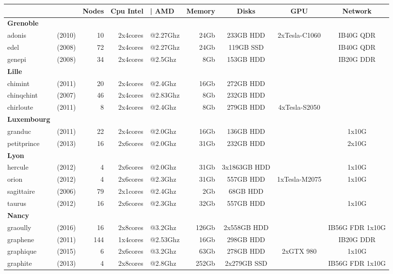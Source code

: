 \begin{center}
\begin{tabular}{|lr|r|rl|r|c|c|c|}
\hline
  & & \textbf{Nodes} & \textbf{Cpu Intel}&\textbf{| AMD} & \textbf{Memory} & \textbf{Disks} & \textbf{GPU} & \textbf{Network} \\ 
\hline
\textbf{Grenoble} &  &  &  &  &  &  &  &  \\
adonis & (2010) & 10 & 2x4cores & @2.27Ghz & 24Gb &  233GB HDD & 2xTesla-C1060 & IB40G QDR \\
edel & (2008) & 72 & 2x4cores & @2.27Ghz & 24Gb &  119GB SSD &  & IB40G QDR \\
genepi & (2008) & 34 & 2x4cores & @2.5Ghz & 8Gb &  153GB HDD &  & IB20G DDR \\
\textbf{Lille} &  &  &  &  &  &  &  &  \\
chimint & (2011) & 20 & 2x4cores & @2.4Ghz & 16Gb &  272GB HDD &  &  \\
chinqchint & (2007) & 46 & 2x4cores & @2.83Ghz & 8Gb &  232GB HDD &  &  \\
chirloute & (2011) & 8 & 2x4cores & @2.4Ghz & 8Gb &  279GB HDD & 4xTesla-S2050 &  \\
\textbf{Luxembourg} &  &  &  &  &  &  &  &  \\
granduc & (2011) & 22 & 2x4cores & @2.0Ghz & 16Gb &  136GB HDD &  &  1x10G \\
petitprince & (2013) & 16 & 2x6cores & @2.0Ghz & 31Gb &  232GB HDD &  &  2x10G \\
\textbf{Lyon} &  &  &  &  &  &  &  &  \\
hercule & (2012) & 4 & 2x6cores & @2.0Ghz & 31Gb &  3x1863GB HDD &  &  1x10G \\
orion & (2012) & 4 & 2x6cores & @2.3Ghz & 31Gb &  557GB HDD & 1xTesla-M2075 &  1x10G \\
sagittaire & (2006) & 79 & 2x1cores & @2.4Ghz & 2Gb &  68GB HDD &  &  \\
taurus & (2012) & 16 & 2x6cores & @2.3Ghz & 32Gb &  557GB HDD &  &  1x10G \\
\textbf{Nancy} &  &  &  &  &  &  &  &  \\
graoully & (2016) & 16 & 2x8cores & @3.2Ghz & 126Gb &  2x558GB HDD &  & IB56G FDR 1x10G \\
graphene & (2011) & 144 & 1x4cores & @2.53Ghz & 16Gb &  298GB HDD &  & IB20G DDR \\
graphique & (2015) & 6 & 2x6cores & @3.2Ghz & 63Gb &  278GB HDD & 2xGTX 980 &  1x10G \\
graphite & (2013) & 4 & 2x8cores & @2.8Ghz & 252Gb &  2x279GB SSD &  & IB56G FDR 1x10G \\

\end{tabular}
\end{center}
